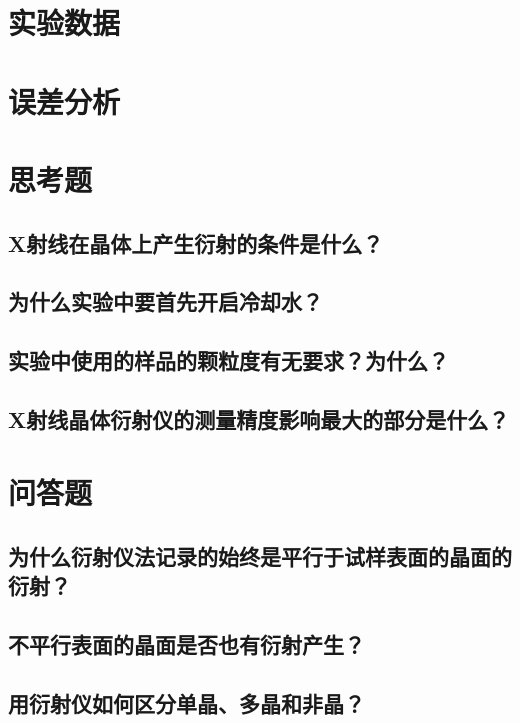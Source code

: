 \documentclass[a4paper]{article}
\begin{document}
\section{实验数据}

\section{误差分析}

\section{思考题}
%
\subsection*{X射线在晶体上产生衍射的条件是什么？}
\subsection*{为什么实验中要首先开启冷却水？}
\subsection*{实验中使用的样品的颗粒度有无要求？为什么？}
\subsection*{X射线晶体衍射仪的测量精度影响最大的部分是什么？}

\section{问答题}
\subsection*{为什么衍射仪法记录的始终是平行于试样表面的晶面的衍射？}
\subsection*{不平行表面的晶面是否也有衍射产生？}
\subsection*{用衍射仪如何区分单晶、多晶和非晶？}

\nocite{jiaocai}

\end{document}
